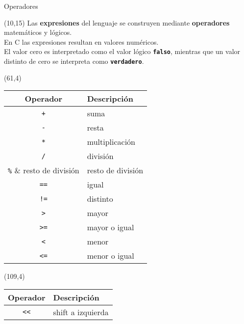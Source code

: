 \documentclass[aspectratio=169]{beamer}
\begin{document}
\begin{frame}[fragile,t]{Operadores}
    \begin{textblock}{50}(10,15) \small
     Las \textbf{expresiones} del lenguaje se construyen mediante \textbf{operadores} matemáticos y lógicos.\\ \bigskip
     En C las expresiones resultan en valores numéricos.\\ \bigskip
     El valor cero es interpretado como el valor lógico \textbf{\texttt{falso}}, mientras que un valor distinto de cero se interpreta como \textbf{\texttt{verdadero}}.
    \end{textblock}
    \begin{textblock}{80}(61,4)
    \begin{tabular}{c|p{2.3cm}}
    \small \textcolor{naranjauca}{Operador} & \small \textcolor{naranjauca}{Descripción}\\
    \hline
    \verb|+|  & \small \textcolor{verdeuca}{suma}           \\
    \verb|-|  & \small \textcolor{verdeuca}{resta}          \\
    \verb|*|  & \small \textcolor{verdeuca}{multiplicación} \\
    \verb|/|  & \small \textcolor{verdeuca}{división}       \\
    \verb|%|  & \small \textcolor{verdeuca}{resto de división}\\ 
    \hline
    \verb|==| & \small \textcolor{verdeuca}{igual}          \\
    \verb|!=| & \small \textcolor{verdeuca}{distinto}       \\
    \verb|>|  & \small \textcolor{verdeuca}{mayor}          \\
    \verb|>=| & \small \textcolor{verdeuca}{mayor o igual}    \\
    \verb|<|  & \small \textcolor{verdeuca}{menor}          \\
    \verb|<=| & \small \textcolor{verdeuca}{menor o igual}    \\
    \end{tabular}
    \end{textblock}
    \begin{textblock}{80}(109,4)
    \begin{tabular}{c|p{2.15cm}}
    \small \textcolor{naranjauca}{Operador} & \small \textcolor{naranjauca}{Descripción}\\
    \hline
    \verb|<<| & \small \textcolor{verdeuca}{shift a izquierda} \\

\end{tabular}
\end{textblock}
\end{frame}
\end{document}

